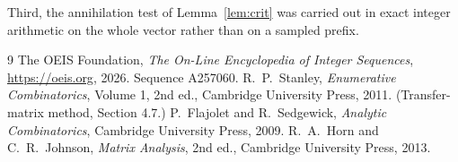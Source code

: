 \documentclass[11pt,a4paper]{article}
\theoremstyle{plain}
\theoremstyle{definition}
\begin{document}
Third, the annihilation test of Lemma~\ref{lem:crit} was carried out in exact integer
arithmetic on the whole vector rather than on a sampled prefix.

\begin{thebibliography}{9}
 The OEIS Foundation, \emph{The On-Line Encyclopedia of Integer
Sequences}, \url{https://oeis.org}, 2026. Sequence A257060.
 R.~P.~Stanley, \emph{Enumerative Combinatorics}, Volume 1, 2nd ed.,
Cambridge University Press, 2011. (Transfer-matrix method, Section 4.7.)
 P.~Flajolet and R.~Sedgewick, \emph{Analytic Combinatorics}, Cambridge
University Press, 2009.
 R.~A.~Horn and C.~R.~Johnson, \emph{Matrix Analysis}, 2nd ed., Cambridge
University Press, 2013.
\end{thebibliography}
\end{document}
